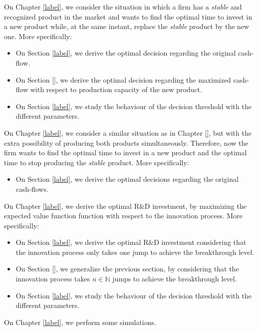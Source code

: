 On Chapter \ref{label}, we consider the situation in which a firm has a \textit{stable} and recognized product in the market and wants to find the optimal time to invest in a new product while, at the same instant, replace the \textit{stable} product by the new one.  More specifically:
\begin{itemize}
	\item On Section \ref{label}, we derive the optimal decision regarding the original cash-flow.
	
	\item On Section \ref{}, we derive the optimal decision regarding the maximized cash-flow with respect to production capacity of the new product.
	
	\item On Section \ref{label}, we study the behaviour of the decision threshold with the different parameters.
\end{itemize}

On Chapter \ref{label}, we consider a similar situation as in Chapter \ref{}, but with the extra possibility of producing both products simultaneously. Therefore, now the firm wants to find the optimal time to invest in a new product and the optimal time to stop producing the \textit{stable} product.  More specifically:
\begin{itemize}
	\item On Section \ref{label}, we derive the optimal decisions regarding the original cash-flows.
\end{itemize}

On Chapter \ref{label}, we derive the optimal R\&D investment, by maximizing the expected value function function with respect to the innovation process. More specifically:
\begin{itemize}
	\item On Section \ref{label}, we derive the optimal R\&D investment considering that the innovation process only takes one jump to achieve the breakthrough level.
	
	\item On Section \ref{}, we generalize the previous section, by considering that the innovation process takes $n \in \mathds{N}$ jumps to achieve the breakthrough level.
	
	\item On Section \ref{label}, we study the behaviour of the decision threshold with the different parameters.
\end{itemize}


On Chapter \ref{label}, we perform some simulations.

